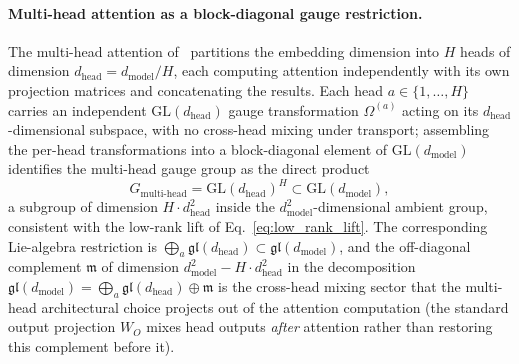 \documentclass[11pt]{article}
\begin{document}
\paragraph{Multi-head attention as a block-diagonal gauge restriction.}
The multi-head attention of~\cite{vaswani2017attention} partitions the embedding dimension into $H$ heads of dimension $d_{\text{head}} = d_{\text{model}}/H$, each computing attention independently with its own projection matrices and concatenating the results. Each head $a \in \{1,\ldots,H\}$ carries an independent $\mathrm{GL}(d_{\text{head}})$ gauge transformation $\Omega^{(a)}$ acting on its $d_{\text{head}}$-dimensional subspace, with no cross-head mixing under transport; assembling the per-head transformations into a block-diagonal element of $\mathrm{GL}(d_{\text{model}})$ identifies the multi-head gauge group as the direct product
\begin{equation}
G_{\text{multi-head}} = \mathrm{GL}(d_{\text{head}})^H \subset \mathrm{GL}(d_{\text{model}}),
\label{eq:multihead_gauge_group}
\end{equation}
a subgroup of dimension $H \cdot d_{\text{head}}^2$ inside the $d_{\text{model}}^2$-dimensional ambient group, consistent with the low-rank lift of Eq.~\eqref{eq:low_rank_lift}. The corresponding Lie-algebra restriction is $\bigoplus_a \mathfrak{gl}(d_{\text{head}}) \subset \mathfrak{gl}(d_{\text{model}})$, and the off-diagonal complement $\mathfrak{m}$ of dimension $d_{\text{model}}^2 - H \cdot d_{\text{head}}^2$ in the decomposition $\mathfrak{gl}(d_{\text{model}}) = \bigoplus_a \mathfrak{gl}(d_{\text{head}}) \oplus \mathfrak{m}$ is the cross-head mixing sector that the multi-head architectural choice projects out of the attention computation (the standard output projection $W_O$ mixes head outputs \emph{after} attention rather than restoring this complement before it).
\end{document}
